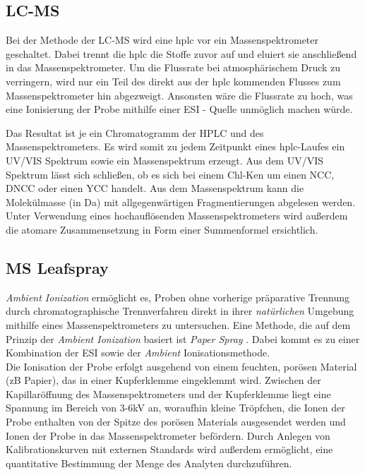 \subsection{LC-MS}

Bei der Methode der LC-MS wird eine \gls{hplc} vor ein Massenspektrometer geschaltet. Dabei trennt die \gls{hplc} die Stoffe zuvor auf und eluiert sie anschließend in das Massenspektrometer. \cite[S. 217-218]{MassSpectrometry} Um die Flussrate bei atmosphärischem Druck zu verringern, wird nur ein Teil des direkt aus der \gls{hplc} kommenden Flusses zum Massenspektrometer hin abgezweigt. Ansonsten wäre die Flussrate zu hoch, was eine Ionisierung der Probe mithilfe einer \gls{ESI} - Quelle unmöglich machen würde. \cite[S. 221]{MassSpectrometry} 

Das Resultat ist je ein Chromatogramm der HPLC und des Massenspektrometers. Es wird somit zu jedem Zeitpunkt eines \gls{hplc}-Laufes ein UV/VIS Spektrum sowie ein Massenspektrum erzeugt. Aus dem UV/VIS Spektrum lässt sich schließen, ob es sich bei einem \gls{Chl-K}en um einen \gls{NCC}, \gls{DNCC} oder einen \gls{YCC} handelt. Aus dem Massenspektrum kann die Molekülmasse (in Da) mit allgegenwärtigen Fragmentierungen abgelesen werden. Unter Verwendung eines hochauflösenden Massenspektrometers wird außerdem die atomare Zusammensetzung in Form einer Summenformel ersichtlich. \\

\subsection{MS Leafspray} \label{sec:MSLeafspray}

\textit{Ambient Ionization} \cite{AmbientIonisation} ermöglicht es, Proben ohne vorherige präparative Trennung durch chromatographische Trennverfahren direkt in ihrer \textit{natürlichen} Umgebung mithilfe eines Massenspektrometers zu untersuchen. Eine Methode, die auf dem Prinzip der \textit{Ambient Ionization} basiert ist \textit{Paper Spray} \cite{PaperSpray}. Dabei  kommt es zu einer Kombination der \gls{ESI} sowie der \textit{Ambient} Ionisationsmethode. \cite{PaperSpray}\\

Die Ionisation der Probe erfolgt ausgehend von einem feuchten, porösen Material (\gls{zB} Papier), das in einer Kupferklemme eingeklemmt wird. Zwischen der Kapillaröffnung des Massenspektrometers und der Kupferklemme liegt eine Spannung im Bereich von 3-6kV an, woraufhin kleine Tröpfchen, die Ionen der Probe enthalten von der Spitze des porösen Materials ausgesendet werden und Ionen der Probe in das Massenspektrometer befördern. \cite{RapidScreeningLeafSpray} Durch Anlegen von Kalibrationskurven mit externen Standards wird außerdem ermöglicht, eine quantitative Bestimmung der Menge des Analyten durchzuführen. \cite{LeafSpray}

